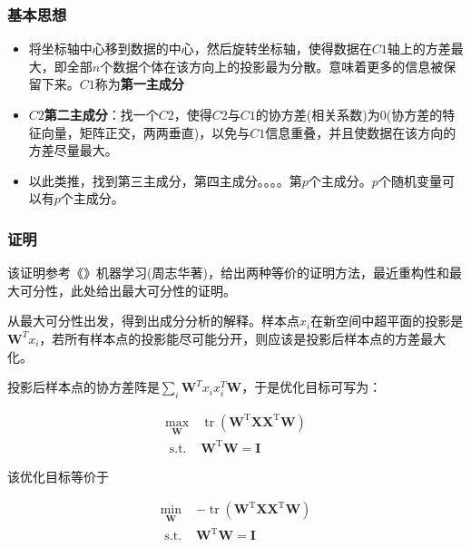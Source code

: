 \documentclass[UTF8]{ctexart}
\numberwithin{equation}{section}
\begin{document}
	\subsubsection{基本思想}
	
	\begin{itemize}
		\item 将坐标轴中心移到数据的中心，然后旋转坐标轴，使得数据在$C1$轴上的方差最大，即全部$n$个数据个体在该方向上的投影最为分散。意味着更多的信息被保留下来。$C1$称为\textbf{第一主成分}
		\item $C2$\textbf{第二主成分}：找一个$C2$，使得$C2$与$C1$的协方差(相关系数)为$0$(协方差的特征向量，矩阵正交，两两垂直)，以免与$C1$信息重叠，并且使数据在该方向的方差尽量最大。
		\item 以此类推，找到第三主成分，第四主成分。。。。第$p$个主成分。$p$个随机变量可以有$p$个主成分。
	\end{itemize}

	\subsubsection{证明}
	
	该证明参考《》机器学习(周志华著)，给出两种等价的证明方法，最近重构性和最大可分性，此处给出最大可分性的证明。
	
	从最大可分性出发，得到出成分分析的解释。样本点$x_{i}$在新空间中超平面的投影是$\mathbf{W}^{T}x_{i}$，若所有样本点的投影能尽可能分开，则应该是投影后样本点的方差最大化。
	
	投影后样本点的协方差阵是$\sum_{i}\mathbf{W}^{T}x_{i}x_{i}^{T}\mathbf{W}$，于是优化目标可写为：

	\begin{equation}
	\begin{array}{cl}\max_{\mathbf{W}} & {\operatorname{tr}\left(\mathbf{W}^{\mathrm{T}} \mathbf{X} \mathbf{X}^{\mathrm{T}} \mathbf{W}\right)} \\
	{\text { s.t. }} & {\mathbf{W}^{\mathrm{T}} \mathbf{W}=\mathbf{I}}\end{array}\tag{1}
	\end{equation}
	
	该优化目标等价于
	
	\begin{equation}
	\begin{array}{cl}{\min _{\mathbf{W}}} & {-\operatorname{tr}\left(\mathbf{W}^{\mathrm{T}} \mathbf{X} \mathbf{X}^{\mathrm{T}} \mathbf{W}\right)} \\ {\text { s.t. }} & {\mathbf{W}^{\mathrm{T}} \mathbf{W}=\mathbf{I}}\end{array}\tag{2}
	\end{equation}
	
\end{document}
